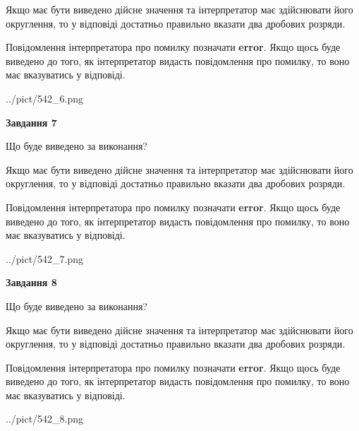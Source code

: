 \documentclass[12pt, ukrainian]{article}
\begin{document}
{\begin {Large}
Якщо має бути виведено дійсне значення та інтерпретатор має здійснювати його округлення, 
то у відповіді достатньо правильно вказати два дробових розряди.

Повідомлення інтерпретатора про помилку позначати \textbf{error}.
Якщо щось буде виведено до того, як інтерпретатор видасть повідомлення про помилку, 
то воно має вказуватись у відповіді. \par

\begin{center}
	{../pict/542_6.png}
\end{center}
\newpage

{\begin {center}\textbf{Завдання 7}\end {center}}\par
Що буде виведено за виконання? \par

Якщо має бути виведено дійсне значення та інтерпретатор має здійснювати його округлення, 
то у відповіді достатньо правильно вказати два дробових розряди.

Повідомлення інтерпретатора про помилку позначати \textbf{error}.
Якщо щось буде виведено до того, як інтерпретатор видасть повідомлення про помилку, 
то воно має вказуватись у відповіді. \par

\begin{center}
	{../pict/542_7.png}
\end{center}
\newpage

{\begin {center}\textbf{Завдання 8}\end {center}}\par
Що буде виведено за виконання? \par

Якщо має бути виведено дійсне значення та інтерпретатор має здійснювати його округлення, 
то у відповіді достатньо правильно вказати два дробових розряди.

Повідомлення інтерпретатора про помилку позначати \textbf{error}.
Якщо щось буде виведено до того, як інтерпретатор видасть повідомлення про помилку, 
то воно має вказуватись у відповіді. \par

\begin{center}
	{../pict/542_8.png}
\end{center}
\newpage


\end{Large}}
\end{document}
